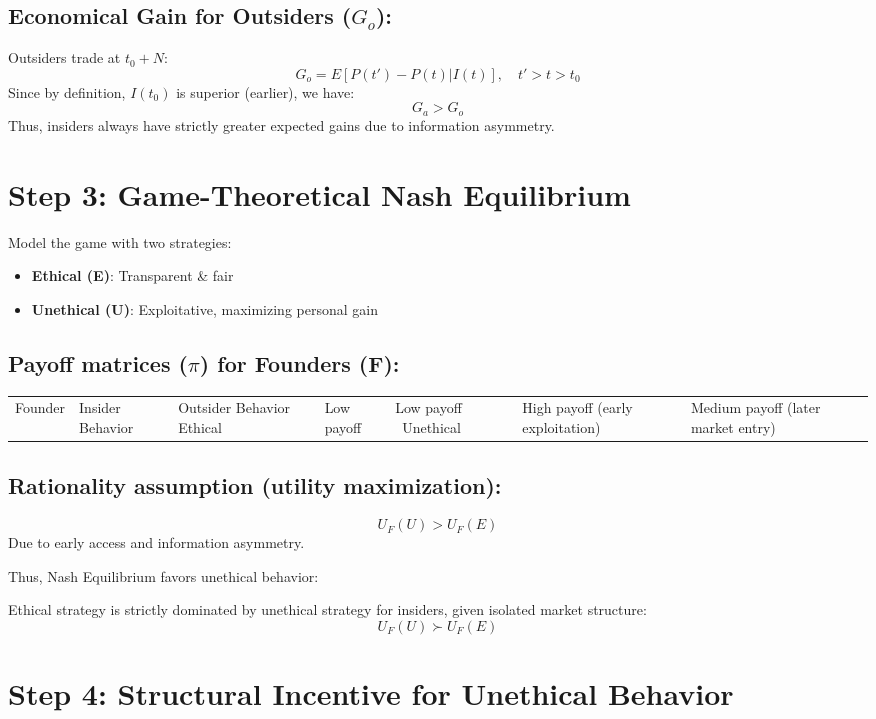 \documentclass{article}
\begin{document}
\subsection*{Economical Gain for Outsiders ($G_o$):}
Outsiders trade at $t_0 + N$:
\[
G_o = E[P(t') - P(t) | I(t)], \quad t' > t > t_0
\]
Since by definition, $I(t_0)$ is superior (earlier), we have:
\[
G_a > G_o
\]
Thus, insiders always have strictly greater expected gains due to information asymmetry.

\section{Step 3: Game-Theoretical Nash Equilibrium}

Model the game with two strategies:
\begin{itemize}
    \item \textbf{Ethical (E)}: Transparent & fair
    \item \textbf{Unethical (U)}: Exploitative, maximizing personal gain
\end{itemize}

\subsection*{Payoff matrices ($\pi$) for Founders (F):}

\begin{tabularx}{\linewidth}{@{}lXX@{}}
\toprule
Founder   & Insider Behavior               & Outsider Behavior                \
\midrule
Ethical   & Low payoff                     & Low payoff                       \
Unethical & High payoff (early exploitation) & Medium payoff (later market entry) \
\bottomrule
\end{tabularx}

\subsection*{Rationality assumption (utility maximization):}
\[
U_F(U) > U_F(E)
\]
Due to early access and information asymmetry.

Thus, Nash Equilibrium favors unethical behavior:

Ethical strategy is strictly dominated by unethical strategy for insiders, given isolated market structure:
\[
U_F(U) \succ U_F(E)
\]

\section{Step 4: Structural Incentive for Unethical Behavior}
\end{document}
